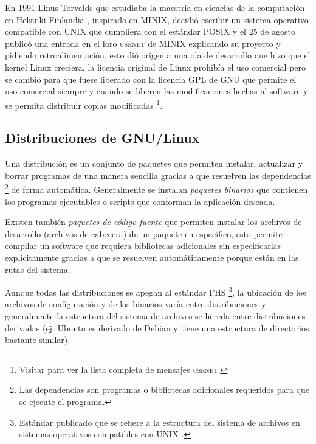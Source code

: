 En 1991 Linus Torvalds que estudiaba la maestr\'{i}a en ciencias de la computaci\'{o}n en Helsinki Finlandia \cite{_staff_????}, inspirado en \textsc{MINIX}, decidi\'{o} escribir un sistema operativo compatible con UNIX que cumpliera con el est\'{a}ndar \textsc{POSIX} y el 25 de agosto public\'{o} una entrada en el foro \textsc{usenet} de \textsc{MINIX} \cite{_history_????} explicando su proyecto y pidiendo retroalimentaci\'{o}n, esto di\'{o} origen a una ola de desarrollo que hizo que el kernel Linux creciera, la licencia original de Linux prohib\'{i}a el uso comercial pero se cambi\'{o} para que fuese liberado con la licencia \textsc{GPL} de \textsc{GNU} que permite el uso comercial siempre y cuando se liberen las modificaciones hechas al software y se permita distribuir copias modificadas \cite{_linux_????-3} \footnote{Visitar \cite{_linuxs_????} para ver la lista completa de mensajes \textsc{usenet}.}.


  \subsection {Distribuciones de GNU/Linux}

Una distribuci\'{o}n es un conjunto de paquetes que permiten instalar, actualizar y borrar programas de una manera sencilla gracias a que resuelven las dependencias \footnote{Las dependencias son programas o bibliotecas adicionales requeridos para que se ejecute el programa.} de forma autom\'{a}tica. Generalmente se instalan \textit{paquetes binarios} que contienen los programas ejecutables o scripts que conforman la aplicaci\'{o}n deseada.

Existen tambi\'{e}n \textit{paquetes de c\'{o}digo fuente} que permiten instalar los archivos de desarrollo (archivos de cabecera) de un paquete en espec\'{i}fico, esto permite compilar un software que requiera bibliotecas adicionales sin especificarlas expl\'{i}citamente gracias a que se resuelven autom\'{a}ticamente porque est\'{a}n en las rutas del sistema.

Aunque todas las distribuciones se apegan al est\'{a}ndar \textsc{FHS} \cite{_filesystem_????} \footnote{Est\'{a}ndar publicado que se refiere a la estructura del sistema de archivos en sistemas operativos compatibles con UNIX \cite{_fhs_????}.}, la ubicaci\'{o}n de los archivos de configuraci\'{o}n y de los binarios var\'{i}a entre distribuciones y generalmente la estructura del sistema de archivos se hereda entre distribuciones derivadas (ej. Ubuntu es derivado de Debian y tiene una estructura de directorios bastante similar).

